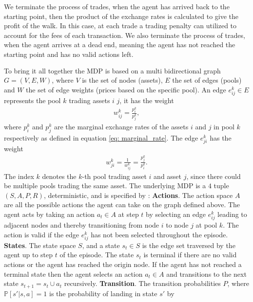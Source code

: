 We terminate the process of trades, when the agent has arrived back to the
starting point, then the product of the exchange rates is calculated to give
the profit of the walk. In this case, at each trade a trading penalty can
utilized to account for the fees of each transaction. We also terminate the
process of trades, when the agent arrives at a dead end, meaning the agent
has not reached the starting point and has no valid actions left.
\newline

To bring it all together the MDP is based on a multi bidirectional graph $G =
(V, E, W)$, where $V$ is the set of nodes (assets), $E$ the set of edges
(pools) and $W$ the set of edge weights (prices based on the specific pool).
An edge $e_{ij}^{k}  \in E$ represents the pool $k$ trading assets $i$ $j$,
it has the weight
\begin{align}
w_{ij}^{k} =\frac{p_i^{k} }{p_j^{k} },
\end{align}
where $p_i^{k} $ and $p_j^{k} $ are the marginal exchange rates of the assets
$i$ and $j$ in pool $k$ respectively as defined in equation
\ref{eq: marginal_rate}. The edge $e_{ji}^{k}$ has the weight
\begin{align}
w_{ji}^{k}  = \frac{1}{w_{ij}^{k} } = \frac{p_j^{k}}{p_i^{k}}.
\end{align}
The index $k$ denotes the $k$-th pool trading asset $i$ and asset $j$, since
there could be multiple pools trading the same asset. The underlying MDP is a
$4$ tuple $(S, A, P, R)$, deterministic, and is specified by
:\newline
\textbf{Actions}. The action space $A$ are all the possible actions the agent
can take on the graph defined above. The agent acts by taking an action $a_t
\in A$ at step $t$ by selecting an edge $e_{ij}^{k}$ leading to adjacent nodes
and thereby transitioning from node $i$ to node $j$ at pool $k$. The
action is valid if the edge $e_{ij}^{k}$ has not been selected throughout the
episode.\newline
\textbf{States}. The state space $S$, and a state $s_t \in S$ is the edge set
traversed by the agent up to step $t$ of the episode. The state $s_t$ is
terminal if there are no valid actions or the agent has reached the origin
node. If the agent has not reached a terminal state then the agent selects an
action $a_t \in A$ and transitions to the next state $s_{t+1} = s_t \cup a_t$
recursively.\newline
\textbf{Transition}. The transition probabilities $P$, where
$\mathbb{P}[s'|s, a] = 1$ is the probability of landing in state $s'$ by
